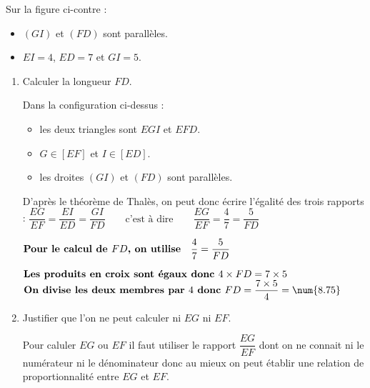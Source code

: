 \begin{corrige}
    \phantom{rrr}

    \begin{minipage}{0.6\linewidth}
        Sur la figure ci-contre :
        \begin{itemize}
            \item $(GI)$ et $(FD)$ sont parallèles.
            \item $EI=4$, $ED=7$ et $GI=5$.
        \end{itemize}
    \end{minipage}
    \begin{minipage}{0.3\linewidth}
    \end{minipage}
    
    \begin{enumerate}
        \item Calculer la longueur $FD$.
        
        {\color{red}
        Dans la configuration ci-dessus : 
        \begin{itemize}
            \item les deux triangles sont $EGI$ et $EFD$.
            \item $G \in [EF]$ et $I \in [ED]$.
            \item les droites $(GI)$ et $(FD)$ sont parallèles.                
        \end{itemize}
        D'après le théorème de Thalès, on peut donc écrire l'égalité des trois rapports :
        $\dfrac{EG}{EF}=\dfrac{EI}{ED}=\dfrac{GI}{FD}\qquad\mbox{c'est à dire}\qquad\dfrac{EG}{EF}=\dfrac{4}{7}=\dfrac{5}{FD}$
    
            $\mbox{\bf Pour le calcul de $FD$, on utilise} \quad \dfrac{4}{7}=\dfrac{5}{FD}$

            $\mbox{\bf Les produits en croix sont égaux donc }4\times FD=7\times5$
            $\mbox{\bf On divise les deux membres par $4$ donc }FD=\dfrac{7\times5}{4}=\num{8.75}$
        }            
        \item Justifier que l'on ne peut calculer ni $EG$ ni $EF$.
        
        {\color{red} Pour caluler $EG$ ou $EF$ il faut utiliser le rapport $\dfrac{EG}{EF}$ dont on ne connait ni le 
        numérateur ni le dénominateur donc au mieux on peut établir une relation de proportionnalité entre $EG$ et $EF$.}
    \end{enumerate}
    
\end{corrige}

